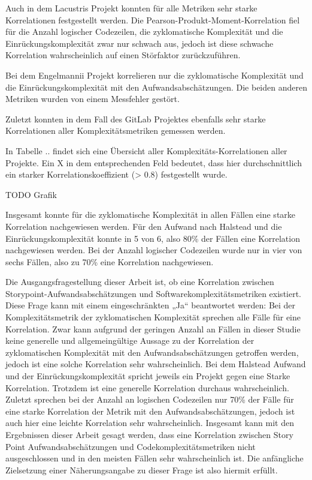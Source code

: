 Auch in dem Lacustris Projekt konnten für alle Metriken
sehr starke Korrelationen festgestellt werden. Die
Pearson-Produkt-Moment-Korrelation fiel für die Anzahl logischer
Codezeilen, die zyklomatische Komplexität und die Einrückungskomplexität
zwar nur schwach aus, jedoch ist diese schwache Korrelation
wahrscheinlich auf einen Störfaktor zurückzuführen.

Bei dem Engelmannii Projekt korrelieren nur die zyklomatische Komplexität und die Einrückungskomplexität mit den
Aufwandsabschätzungen. Die beiden anderen Metriken wurden von einem
Messfehler gestört.

Zuletzt konnten in dem Fall des GitLab Projektes ebenfalls sehr starke
Korrelationen aller Komplexitätsmetriken gemessen werden.

In Tabelle .. findet sich eine Übersicht aller
Komplexitäts-Korrelationen aller Projekte. Ein X in dem entsprechenden
Feld bedeutet, dass hier durchschnittlich ein starker
Korrelationskoeffizient (\textgreater{} 0.8) festgestellt wurde.

TODO Grafik

Insgesamt konnte für die zyklomatische Komplexität in allen Fällen eine
starke Korrelation nachgewiesen werden. Für den Aufwand nach Halstead
und die Einrückungskomplexität konnte in 5 von 6, also 80\% der Fällen
eine Korrelation nachgewiesen werden. Bei der Anzahl logischer
Codezeilen wurde nur in vier von sechs Fällen, also zu 70\% eine
Korrelation nachgewiesen.

Die Ausgangsfragestellung dieser Arbeit ist, ob eine Korrelation
zwischen Storypoint-Aufwandsabschätzungen und
Softwarekomplexitätsmetriken existiert. Diese Frage kann mit einem
eingeschränkten „Ja`` beantwortet werden: Bei der Komplexitätsmetrik der
zyklomatischen Komplexität sprechen alle Fälle für eine Korrelation.
Zwar kann aufgrund der geringen Anzahl an Fällen in dieser Studie keine
generelle und allgemeingültige Aussage zu der Korrelation der
zyklomatischen Komplexität mit den Aufwandsabschätzungen getroffen
werden, jedoch ist eine solche Korrelation sehr wahrscheinlich. Bei dem
Halstead Aufwand und der Einrückungskomplexität spricht jeweils ein
Projekt gegen eine Starke Korrelation. Trotzdem ist eine generelle
Korrelation durchaus wahrscheinlich. Zuletzt sprechen bei der Anzahl an
logischen Codezeilen nur 70\% der Fälle für eine starke Korrelation der
Metrik mit den Aufwandsabschätzungen, jedoch ist auch hier eine leichte
Korrelation sehr wahrscheinlich. Insgesamt kann mit den Ergebnissen
dieser Arbeit gesagt werden, dass eine Korrelation zwischen Story Point
Aufwandsabschätzungen und Codekomplexitätsmetriken nicht ausgeschlossen
und in den meisten Fällen sehr wahrscheinlich ist. Die anfängliche
Zielsetzung einer Näherungsangabe zu dieser Frage ist also hiermit
erfüllt.